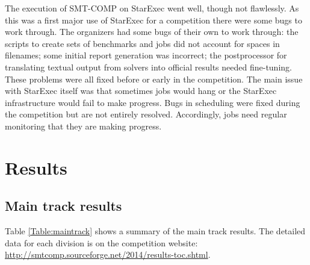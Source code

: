 \documentclass[twoside,11pt]{article}
\begin{document}
The execution of SMT-COMP on StarExec went well, though not flawlessly. As this was a first major use of StarExec for a competition there were some bugs to work through.
The organizers had some bugs of their own to work through: the scripts to create sets of benchmarks and jobs did not account for spaces in filenames; some initial report generation was incorrect; the postprocessor for translating textual output from solvers into official results needed fine-tuning. These problems were all fixed before or early in the competition. The main issue with StarExec itself was that sometimes jobs would hang or the StarExec infrastructure would fail to make progress. Bugs in scheduling were
fixed during the competition but are not entirely resolved. Accordingly, jobs need regular monitoring that they are making progress.

\section{Results}
\label{sec:results}

\subsection{Main track results}
\label{sec:timeouts}

Table \ref{Table:maintrack} shows a summary of the main track results. The detailed data for each division is on the competition website: \url{http://smtcomp.sourceforge.net/2014/results-toc.shtml}.
 
\end{document}
